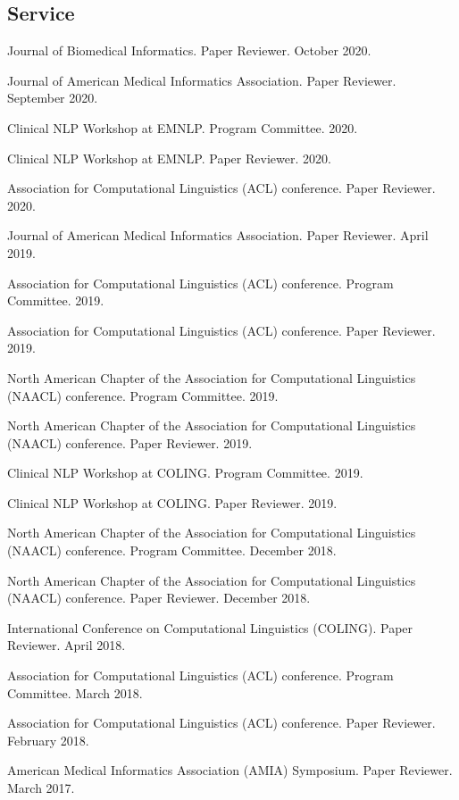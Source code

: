 \documentclass[letterpaper]{article}
\renewenvironment{itemize}{
  \begin{list}{}{
    \setlength{\leftmargin}{1.5em}
  }
}{
  \end{list}
}
\begin{document}
\subsection*{Service}

\begin{itemize}
\item Journal of Biomedical Informatics. Paper Reviewer. October 2020.
\item Journal of American Medical Informatics Association. Paper Reviewer. September 2020.
\item Clinical NLP Workshop at EMNLP. Program Committee. 2020.
\item Clinical NLP Workshop at EMNLP. Paper Reviewer. 2020.
\item Association for Computational Linguistics (ACL) conference. Paper Reviewer. 2020.
\item Journal of American Medical Informatics Association. Paper Reviewer. April 2019.
\item Association for Computational Linguistics (ACL) conference. Program Committee. 2019.
\item Association for Computational Linguistics (ACL) conference. Paper Reviewer. 2019.
\item North American Chapter of the Association for Computational Linguistics (NAACL) conference. Program Committee. 2019.
\item North American Chapter of the Association for Computational Linguistics (NAACL) conference. Paper Reviewer. 2019.
\item Clinical NLP Workshop at COLING. Program Committee. 2019.
\item Clinical NLP Workshop at COLING. Paper Reviewer. 2019.
\item North American Chapter of the Association for Computational Linguistics (NAACL) conference. Program Committee. December 2018.
\item North American Chapter of the Association for Computational Linguistics (NAACL) conference. Paper Reviewer. December 2018.
\item International Conference on Computational Linguistics (COLING). Paper Reviewer. April 2018.
\item Association for Computational Linguistics (ACL) conference. Program Committee. March 2018.
\item Association for Computational Linguistics (ACL) conference. Paper Reviewer. February 2018.
\item American Medical Informatics Association (AMIA) Symposium. Paper Reviewer. March 2017.

\end{itemize}
\end{document}
